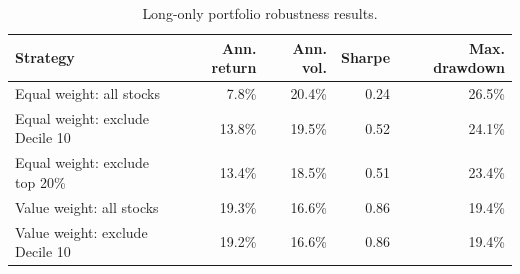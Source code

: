\begin{table}[!htbp]
\centering
\footnotesize
\caption{Long-only portfolio robustness results.}
\label{tab:portfolio-robustness}
\begin{tabular}{lrrrr}
\toprule
Strategy & Ann. return & Ann. vol. & Sharpe & Max. drawdown \\
\midrule
Equal weight: all stocks & 7.8\% & 20.4\% & 0.24 & 26.5\% \\
Equal weight: exclude Decile 10 & 13.8\% & 19.5\% & 0.52 & 24.1\% \\
Equal weight: exclude top 20\% & 13.4\% & 18.5\% & 0.51 & 23.4\% \\
Value weight: all stocks & 19.3\% & 16.6\% & 0.86 & 19.4\% \\
Value weight: exclude Decile 10 & 19.2\% & 16.6\% & 0.86 & 19.4\% \\
\bottomrule
\end{tabular}
\end{table}
